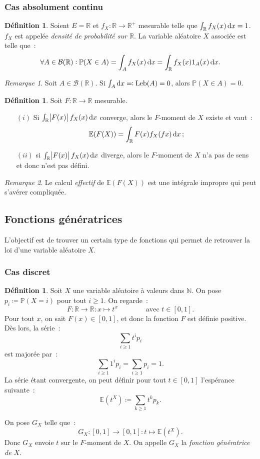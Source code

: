 \documentclass{article}
\newcommand{\E}{\mathbb E}
\newcommand{\N}{\mathbb N}
\renewcommand{\P}{\mathbb P}
\newcommand{\R}{\mathbb R}
\DeclareMathOperator{\Leb}{Leb}
\theoremstyle{definition}
\newtheorem{déf}[thm]{Définition}
\theoremstyle{remark}
\newtheorem*{rmq}{Remarque}
\begin{document}
		\subsubsection{Cas absolument continu}
		\begin{déf} Soient $E = \R$ et $f_X : \R \to \R^+$ mesurable telle que $\int_\R f_X(x)\dif x = 1$. $f_X$ est appelée \emph{densité de probabilité sur
		$\R$}. La variable aléatoire $X$ associée est telle que~:
		\[\forall A \in \mathcal B(\R) : \P(X \in A) = \int_A f_X(x)\dif x = \int_\R f_X(x)1_A(x)\dif x.\]
		\end{déf}

		\begin{rmq} Soit $A \in \mathcal B(\R)$. Si $\int_A\dif x \eqqcolon \Leb(A) = 0$, alors $\P(X \in A) = 0$. \end{rmq}

		\begin{déf} Soit $F : \R \to \R$ mesurable.

		\begin{itemize}
			\item[$(i)$] Si $\int_\R \abs{F(x)}f_X(x)\dif x$ converge, alors le $F$-moment de $X$ existe et vaut~:
			             \[\E(F(X)) = \int_\R F(x)f_X(fx)\dif x\,;\]
			\item[$(ii)$] si $\int_\R \abs{F(x)}f_X(x)\dif x$ diverge, alors le $F$-moment de $X$ n'a pas de sens et donc n'est pas défini.
		\end{itemize}
		\end{déf}

		\begin{rmq} Le calcul \emph{effectif} de $\E(F(X))$ est une intégrale impropre qui peut s'avérer compliquée. \end{rmq}
	
	\subsection{Fonctions génératrices}
		L'objectif est de trouver un certain type de fonctions qui permet de retrouver la loi d'une variable aléatoire $X$.

		\subsubsection{Cas discret}
		\begin{déf} Soit $X$ une variable aléatoire à valeurs dans $\N$. On pose $p_i \coloneqq \P(X = i)$ pour tout $i \geq 1$.
		On regarde~:
		\[F : \R \to \R : x \mapsto t^x\qquad\qquad\text{avec }t \in [0, 1].\]
		Pour tout $x$, on sait $F(x) \in [0, 1]$, et donc la fonction $F$ est définie positive. Dès lors, la série~:
		\[\sum_{i \geq 1}t^ip_i\]
		est majorée par~:
		\[\sum_{i \geq 1}1^ip_i = \sum_{i \geq 1}p_i = 1.\]
		La série étant convergente, on peut définir pour tout $t \in [0, 1]$ l'espérance suivante~:
		\[\E(t^X) \coloneqq \sum_{k \geq 1}t^kp_k.\]

		On pose $G_X$ telle que~:
		\[G_X : [0, 1] \to [0, 1] : t \mapsto \E(t^X).\]
		Donc $G_X$ envoie $t$ sur le $F$-moment de $X$. On appelle $G_X$ la \emph{fonction génératrice de $X$}.
		\end{déf}
\end{document}
